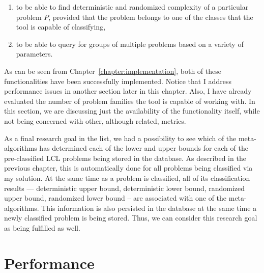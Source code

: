 \begin{enumerate}
  \item to be able to find deterministic and randomized complexity
  of a particular problem $P$, provided that the problem belongs to
  one of the classes that the tool is capable of classifying,
  \item to be able to query for groups of multiple problems based
  on a variety of parameters.
\end{enumerate}

As can be seen from Chapter~\ref{chapter:implementation},
both of these functionalities have been successfully implemented.
Notice that
I address performance issues in another section later in
this chapter. Also,
I have already evaluated the number of
problem families the tool is capable of working with. In this section,
we are discussing just the availability of the functionality itself, while not
being concerned with other, although related, metrics.


As a final research goal in the list, we had a possibility
to see which of the meta-algorithms has determined each
of the lower and upper bounds for each of the pre-classified
LCL problems being stored in the database. As described in the
previous chapter, this is automatically done for all problems being
classified via my solution. At the same time as a problem is classified,
all of its classification results --- deterministic upper bound,
deterministic lower bound, randomized upper bound, randomized lower bound --
are associated with one of the meta-algorithms. This information is also
persisted in the database at the same time a newly classified problem
is being stored. Thus, we can consider this research goal as being
fulfilled as well.

\section{Performance}

